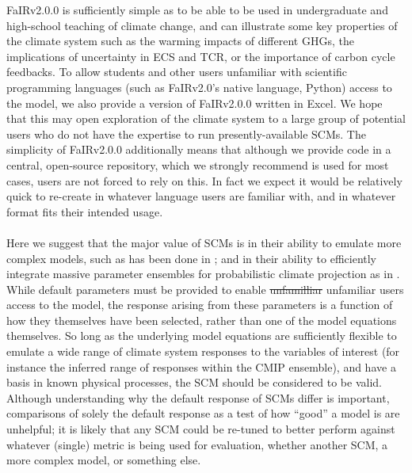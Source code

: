 \documentclass[gmd, manuscript]{copernicus}
\providecommand{\DIFadd}[1]{{\protect\color{blue}#1}} %
\providecommand{\DIFdel}[1]{{\protect\color{red}\sout{#1}}}                      %
\providecommand{\DIFaddbegin}{} %
\providecommand{\DIFaddend}{} %
\providecommand{\DIFdelbegin}{} %
\providecommand{\DIFdelend}{} %
\begin{document}
%
FaIRv2.0\DIFaddbegin \DIFadd{.0 }\DIFaddend is sufficiently simple as to be able to be used in undergraduate and high-school teaching of climate change, and can illustrate some key properties of the climate system such as the warming impacts of different GHGs, the implications of uncertainty in ECS and TCR, or the importance of carbon cycle feedbacks. To allow students and other users unfamiliar with scientific programming languages (such as FaIRv2.0's native language, Python) access to the model, we also provide a version of FaIRv2.0\DIFaddbegin \DIFadd{.0 }\DIFaddend written in Excel. We hope that this may open exploration of the climate system to a large group of potential users who do not have the expertise to run presently-available SCMs. The simplicity of FaIRv2.0\DIFaddbegin \DIFadd{.0 }\DIFaddend additionally means that although we provide code in a central, open-source repository, which we strongly recommend is used for most cases, users are not forced to rely on this. In fact we expect it would be relatively quick to re-create in whatever language users are familiar with, and in whatever format fits their intended usage.\\\\
%
Here we suggest that the major value of SCMs is in their ability to emulate more complex models, such as has been done in \cite{Meinshausen2011b,Tsutsui2017,Tsutsui2020}; and in their ability to efficiently integrate massive parameter ensembles for probabilistic climate projection as in \cite{Smith2018,Goodwin2019}. While default parameters must be provided to enable \DIFdelbegin \DIFdel{unfamilliar }\DIFdelend \DIFaddbegin \DIFadd{unfamiliar }\DIFaddend users access to the model, the response arising from these parameters is a function of how they themselves have been selected, rather than one of the model equations themselves. So long as the underlying model equations are sufficiently flexible to emulate a wide range of climate system responses to the variables of interest (for instance the inferred range of responses within the CMIP ensemble), and have a basis in known physical processes, the SCM should be considered to be valid. Although understanding why the default response of SCMs differ is important, comparisons of solely the default response as a test of how ``good'' a model is are unhelpful; it is likely that any SCM could be re-tuned to better perform against whatever (single) metric is being used for evaluation, whether another SCM, a more complex model, or something else.\\\\
\end{document}
